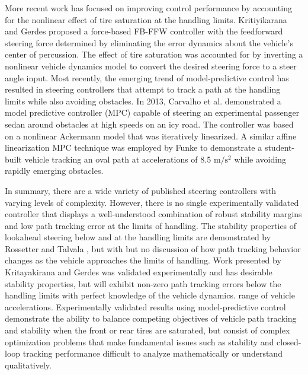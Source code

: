More recent work has focused on improving control performance by accounting for the nonlinear effect of tire saturation at the handling limits. 
Kritiyikarana and Gerdes \cite{mickcop} proposed a force-based FB-FFW controller with the feedforward steering force
 determined by eliminating the error dynamics about the vehicle's center of percussion. The effect of tire saturation was accounted
 for by inverting a nonlinear vehicle dynamics model to convert the desired steering force to a steer angle input. 
Most recently, the emerging trend of model-predictive control has resulted in steering controllers that 
attempt to track a path at the handling limits while also avoiding obstacles. In 2013, Carvalho et al. \cite{carvalho13} demonstrated a model predictive controller (MPC) 
capable of steering an experimental passenger sedan around obstacles at high speeds on an icy road. The controller was based 
on a nonlinear Ackermann model that was iteratively linearized. A similar affine linearization MPC technique was employed by Funke \cite{joethesis} to demonstrate
a student-built vehicle tracking an oval path at accelerations of 8.5 $\mathrm{m/s^2}$ while avoiding rapidly emerging obstacles.  

In summary, there are a wide variety of published steering controllers with varying levels of complexity. However, there is no
 single experimentally validated controller that displays a well-understood combination of robust stability margins
 and low path tracking error at the limits of handling.  The stability properties of lookahead steering below and at the handling
 limits are demonstrated by Rossetter \cite{rosseter} and Talvala \cite{talvthesis}, but with but no discussion of how
 path tracking behavior changes as the vehicle approaches the limits of handling.
Work presented by Kritayakirana and Gerdes \cite{mickcop} was validated
experimentally and has desirable stability properties, but will exhibit non-zero
 path tracking errors below the handling limits with perfect knowledge of the vehicle dynamics.  
range of vehicle accelerations. Experimentally validated results using model-predictive control \cite{carvalho13}\cite{joethesis} demonstrate the ability to balance competing
objectives of vehicle path tracking and stability when the front or rear tires are saturated, but 
consist of complex optimization problems that make fundamental issues such as stability and closed-loop tracking performance difficult to analyze mathematically or
understand qualitatively. 

